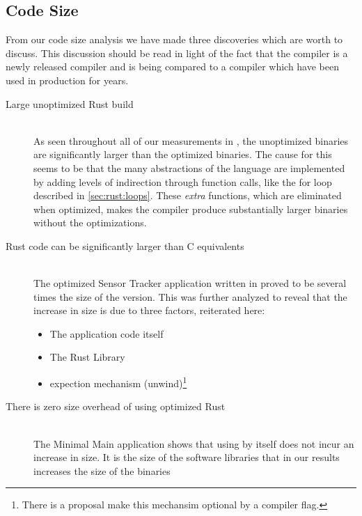 \subsection{Code Size}

From our code size analysis we have made three discoveries which are worth to discuss.
This discussion should be read in light of the fact that the {\rust} compiler is a newly released compiler and is being compared to a {\C} compiler which have been used in production for years.

\begin{description}

\item [Large unoptimized Rust build] \hfill \\
  As seen throughout all of our measurements in {\rust}, the unoptimized binaries are significantly larger than the optimized binaries.
  The cause for this seems to be that the many abstractions of the {\rust} language are implemented by adding levels of indirection through function calls, like the for loop described in \autoref{sec:rust:loops}.
  These \emph{extra} functions, which are eliminated when optimized, makes the compiler produce substantially larger binaries without the optimizations.

\item [Rust code can be significantly larger than C equivalents] \hfill \\
  The optimized Sensor Tracker application written in {\rust} proved to be several times the size of the {\C} version.
  This was further analyzed to reveal that the increase in size is due to three factors, reiterated here:
\begin{itemize}
\item The application code itself
\item The Rust Library
\item {\rust} expection mechanism (unwind)\footnote{There is a proposal make this mechansim optional by a compiler flag.}
\end{itemize}

\item [There is zero size overhead of using optimized Rust] \hfill \\
  The Minimal Main application shows that using {\rust} by itself does not incur an increase in size.
  It is the size of the software libraries that in our results increases the size of the {\rust} binaries

\end{description}

